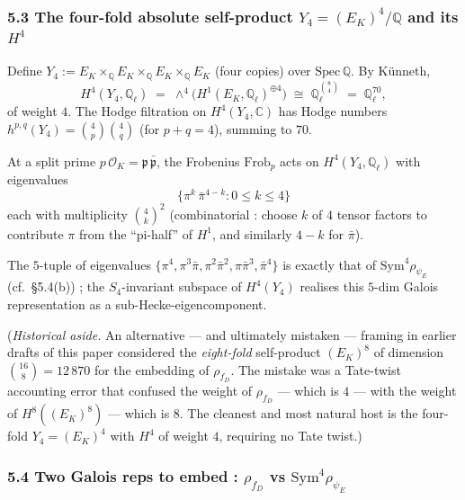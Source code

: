 \documentclass[
  11pt,
  a4paper,
]{amsart}
\begin{document}
\hypertarget{the-four-fold-absolute-self-product-y_4-e_k4-mathbbq-and-its-h4}{%
\subsubsection{\texorpdfstring{5.3 The four-fold absolute self-product \(Y_4 = (E_K)^4 / \mathbb{Q}\) and its \(H^4\)}{5.3 The four-fold absolute self-product Y\_4 = (E\_K)\^{}4 / \textbackslash mathbb\{Q\} and its H\^{}4}}\label{the-four-fold-absolute-self-product-y_4-e_k4-mathbbq-and-its-h4}}

Define \(Y_4 := E_K \times_\mathbb{Q} E_K \times_\mathbb{Q} E_K \times_\mathbb{Q} E_K\) (four copies) over \(\mathrm{Spec}\,\mathbb{Q}\). By Künneth,
\[
H^4(Y_4, \mathbb{Q}_\ell) \;=\; \wedge^4 \bigl(H^1(E_K, \mathbb{Q}_\ell)^{\oplus 4}\bigr) \;\cong\; \mathbb{Q}_\ell^{\binom{8}{4}} \;=\; \mathbb{Q}_\ell^{70},
\]
of weight \(4\). The Hodge filtration on \(H^4(Y_4, \mathbb{C})\) has Hodge numbers \(h^{p, q}(Y_4) = \binom{4}{p} \binom{4}{q}\) (for \(p + q = 4\)), summing to \(70\).

At a split prime \(p\,\mathcal{O}_K = \mathfrak{p}\,\bar{\mathfrak{p}}\), the Frobenius \(\mathrm{Frob}_p\) acts on \(H^4(Y_4, \mathbb{Q}_\ell)\) with eigenvalues
\[
\bigl\{ \pi^k\,\bar\pi^{4 - k} : 0 \leq k \leq 4 \bigr\}
\]
each with multiplicity \(\binom{4}{k}^2\) (combinatorial : choose \(k\) of \(4\) tensor factors to contribute \(\pi\) from the ``pi-half'' of \(H^1\), and similarly \(4 - k\) for \(\bar\pi\)).

The \(5\)-tuple of eigenvalues \(\{\pi^4, \pi^3 \bar\pi, \pi^2 \bar\pi^2, \pi \bar\pi^3, \bar\pi^4\}\) is exactly that of \(\mathrm{Sym}^4 \rho_{\psi_E}\) (cf.~§5.4(b)) ; the \(S_4\)-invariant subspace of \(H^4(Y_4)\) realises this \(5\)-dim Galois representation as a sub-Hecke-eigencomponent.

(\emph{Historical aside.} An alternative --- and ultimately mistaken --- framing in earlier drafts of this paper considered the \emph{eight-fold} self-product \((E_K)^8\) of dimension \(\binom{16}{8} = 12\,870\) for the embedding of \(\rho_{f_D}\). The mistake was a Tate-twist accounting error that confused the weight of \(\rho_{f_D}\) --- which is \(4\) --- with the weight of \(H^8((E_K)^8)\) --- which is \(8\). The cleanest and most natural host is the four-fold \(Y_4 = (E_K)^4\) with \(H^4\) of weight \(4\), requiring no Tate twist.)

\hypertarget{two-galois-reps-to-embed-rho_f_d-vs-mathrmsym4-rho_psi_e}{%
\subsubsection{\texorpdfstring{5.4 Two Galois reps to embed : \(\rho_{f_D}\) vs \(\mathrm{Sym}^4 \rho_{\psi_E}\)}{5.4 Two Galois reps to embed : \textbackslash rho\_\{f\_D\} vs \textbackslash mathrm\{Sym\}\^{}4 \textbackslash rho\_\{\textbackslash psi\_E\}}}\label{two-galois-reps-to-embed-rho_f_d-vs-mathrmsym4-rho_psi_e}}
\end{document}
